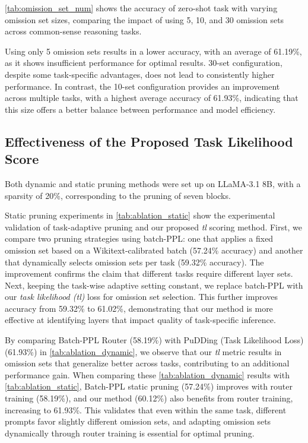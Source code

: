  

\cref{tab:omission_set_num} shows the accuracy of zero-shot task with varying omission set sizes, comparing the impact of using 5, 10, and 30 omission sets across common-sense reasoning tasks. 

Using only 5 omission sets results in a lower accuracy, with an average of 61.19\%, as it shows insufficient performance for optimal results. 30-set configuration, despite some task-specific advantages, does not lead to consistently higher performance. In contrast, the 10-set configuration provides an improvement across multiple tasks, with a highest average accuracy of 61.93\%, indicating that this size offers a better balance between performance and model efficiency. 

\subsection{Effectiveness of the Proposed Task Likelihood Score}\label{app:ssec_tasklikelihood}


Both dynamic and static pruning methods were set up on LLaMA-3.1 8B, with a sparsity of 20\%, corresponding to the pruning of seven blocks.

Static pruning experiments in \cref{tab:ablation_static} show the experimental validation of task-adaptive pruning and our proposed \textit{tl} scoring method. First, we compare two pruning strategies using batch-PPL: one that applies a fixed omission set based on a Wikitext-calibrated batch (57.24\% accuracy) and another that dynamically selects omission sets per task (59.32\% accuracy). The improvement confirms the claim that different tasks require different layer sets. 
Next, keeping the task-wise adaptive setting constant, we replace batch-PPL with our \textit{task likelihood (tl) } loss for omission set selection. This further improves accuracy from 59.32\% to 61.02\%, demonstrating that our method is more effective at identifying layers that impact quality of task-specific inference. 


By comparing Batch-PPL Router (58.19\%) with PuDDing (Task Likelihood Loss) (61.93\%) in \cref{tab:ablation_dynamic}, we observe that our \textit{tl} metric results in omission sets that generalize better across tasks, contributing to an additional performance gain. When comparing these \cref{tab:ablation_dynamic} results with \cref{tab:ablation_static}, Batch-PPL static pruning (57.24\%) improves with router training (58.19\%), and our method (60.12\%) also benefits from router training, increasing to 61.93\%. This validates that even within the same task, different prompts favor slightly different omission sets, and adapting omission sets dynamically through router training is essential for optimal pruning.





